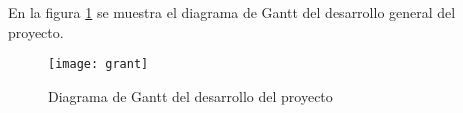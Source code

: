 En la figura \ref{fig:grant} se muestra el diagrama de Gantt del desarrollo general del proyecto.
\begin{figure}[h]
    \centering
    \texttt{[image: grant]}
    \caption{Diagrama de Gantt del desarrollo del proyecto}
    \label{fig:grant}
\end{figure}
